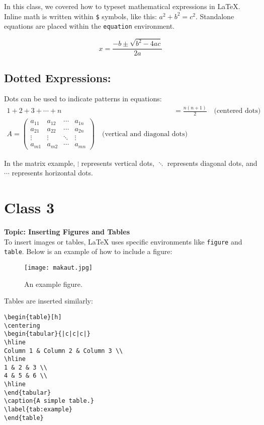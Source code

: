 In this class, we covered how to typeset mathematical expressions in \LaTeX{}. Inline math is written within \verb|$| symbols, like this: $a^2 + b^2 = c^2$. Standalone equations are placed within the \verb|equation| environment.

\begin{equation}
    x = \frac{-b \pm \sqrt{b^2 - 4ac}}{2a}
\end{equation}

\subsection*{Dotted Expressions:}
Dots can be used to indicate patterns in equations:
\begin{align}
    1 + 2 + 3 + \cdots + n &= \frac{n(n+1)}{2} \quad \text{(centered dots)} \\
    A = \begin{pmatrix} 
            a_{11} & a_{12} & \cdots & a_{1n} \\
            a_{21} & a_{22} & \cdots & a_{2n} \\
            \vdots & \vdots & \ddots & \vdots \\
            a_{m1} & a_{m2} & \cdots & a_{mn} 
        \end{pmatrix} \quad \text{(vertical and diagonal dots)}
\end{align}

In the matrix example, $\vdots$ represents vertical dots, $\ddots$ represents diagonal dots, and $\cdots$ represents horizontal dots.

\section*{Class 3}
\textbf{Topic: Inserting Figures and Tables} \\

To insert images or tables, \LaTeX{} uses specific environments like \texttt{figure} and \texttt{table}. Below is an example of how to include a figure:

\begin{figure}[h]
    \centering
    \texttt{[image: makaut.jpg]}
    \caption{An example figure.}
    \label{fig:fig_example}
\end{figure}

Tables are inserted similarly:
\begin{verbatim}
\begin{table}[h]
\centering
\begin{tabular}{|c|c|c|}
\hline
Column 1 & Column 2 & Column 3 \\
\hline
1 & 2 & 3 \\
4 & 5 & 6 \\
\hline
\end{tabular}
\caption{A simple table.}
\label{tab:example}
\end{table}
\end{verbatim}

